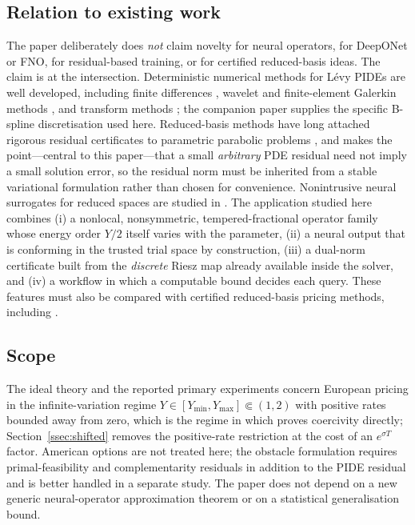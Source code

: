 \documentclass[11pt]{amsart}
\theoremstyle{remark}
\begin{document}
\subsection*{Relation to existing work}

The paper deliberately does \emph{not} claim novelty for neural operators, for
DeepONet or FNO, for residual-based training, or for certified reduced-basis
ideas.  The claim is at the intersection.  Deterministic numerical methods for
L\'evy PIDEs are well developed, including finite differences
\cite{ContVoltchkova2005}, wavelet and finite-element Galerkin methods
\cite{MatacheVonPetersdorffSchwab2004,HilberReichmannSchwabWinter2013}, and
transform methods \cite{FangOosterlee2008}; the companion paper
\cite{DamircheliCGMY2026} supplies the specific B-spline discretisation used
here.  Reduced-basis methods have long attached rigorous residual certificates
to parametric parabolic problems
\cite{GreplPatera2005,RozzaHuynhPatera2008,HaasdonkOhlberger2008}, and
\cite{QiuDahmenChen2026} makes the point---central to this paper---that a
small \emph{arbitrary} PDE residual need not imply a small solution error, so
the residual norm must be inherited from a stable variational formulation
rather than chosen for convenience.  Nonintrusive neural surrogates for
reduced spaces are studied in
\cite{HesthavenUbbiali2018,BhattacharyaEtAl2021}.  The application studied here combines (i) a nonlocal, nonsymmetric, tempered-fractional operator
family whose energy order $Y/2$ itself varies with the parameter, (ii) a
neural output that is conforming in the trusted trial space by construction,
(iii) a dual-norm certificate built from the \emph{discrete} Riesz map already
available inside the solver, and (iv) a workflow in which a computable bound decides each query.
These features must also be compared with certified reduced-basis pricing
methods, including \cite{ContLantosPironneau2011}.

\subsection*{Scope}

The ideal theory and the reported primary experiments concern European pricing in the
infinite-variation regime $Y\in[Y_{\min},Y_{\max}]\Subset(1,2)$ with positive
rates bounded away from zero, which is the regime in which
\cite{DamircheliCGMY2026} proves coercivity directly;
Section~\ref{ssec:shifted} removes the positive-rate restriction at the cost
of an $e^{\sigma T}$ factor.  American options are not treated here; the
obstacle formulation requires primal-feasibility and complementarity residuals
in addition to the PIDE residual and is better handled in a separate study.
The paper does not depend on a new generic neural-operator approximation
theorem or on a statistical generalisation bound.
\end{document}
